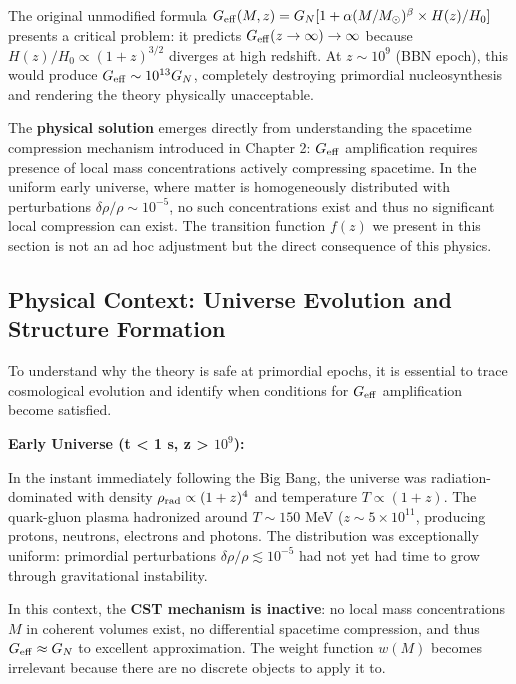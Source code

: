 \documentclass[11pt,a4paper]{article}
\begin{document}
The original unmodified formula
\(G_{\rm eff}(M,z) = G_N[1 + \alpha(M/M_\odot)^\beta \times H(z)/H_0]\)
presents a critical problem: it predicts
\(G_{\rm eff}(z \to \infty) \to \infty\) because
\(H(z)/H_0 \propto (1+z)^{3/2}\) diverges at high redshift. At
\(z \sim 10^9\) (BBN epoch), this would produce
\(G_{\rm eff} \sim 10^{13} G_N\), completely destroying primordial
nucleosynthesis and rendering the theory physically unacceptable.

The \textbf{physical solution} emerges directly from understanding the
spacetime compression mechanism introduced in Chapter 2: \(G_{\rm eff}\)
amplification requires presence of local mass concentrations actively
compressing spacetime. In the uniform early universe, where matter is
homogeneously distributed with perturbations
\(\delta\rho/\rho \sim 10^{-5}\), no such concentrations exist and thus
no significant local compression can exist. The transition function
\(f(z)\) we present in this section is not an ad hoc adjustment but the
direct consequence of this physics.

\hypertarget{physical-context-universe-evolution-and-structure-formation}{%
\subsection{Physical Context: Universe Evolution and Structure
Formation}\label{physical-context-universe-evolution-and-structure-formation}}

To understand why the theory is safe at primordial epochs, it is
essential to trace cosmological evolution and identify when conditions
for \(G_{\rm eff}\) amplification become satisfied.

\textbf{Early Universe (t \textless{} 1 s, z \textgreater{} $10^{9}$):}

In the instant immediately following the Big Bang, the universe was
radiation-dominated with density \(\rho_{\rm rad} \propto (1+z)^4\) and
temperature \(T \propto (1+z)\). The quark-gluon plasma hadronized
around \(T \sim 150\) MeV (\(z \sim 5 \times 10^{11}\), producing
protons, neutrons, electrons and photons. The distribution was
exceptionally uniform: primordial perturbations
\(\delta\rho/\rho \lesssim 10^{-5}\) had not yet had time to grow
through gravitational instability.

In this context, the \textbf{CST mechanism is inactive}: no local mass
concentrations \(M\) in coherent volumes exist, no differential
spacetime compression, and thus \(G_{\rm eff} \approx G_N\) to excellent
approximation. The weight function \(w(M)\) becomes irrelevant because
there are no discrete objects to apply it to.
\end{document}
